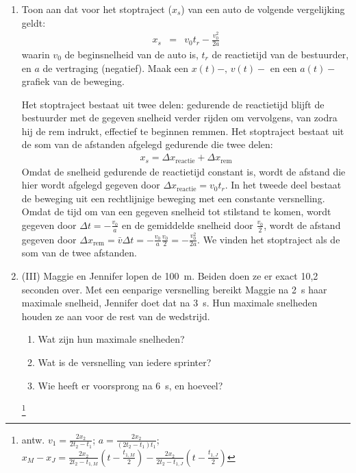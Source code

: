 \begin{enumerate}
\item Toon aan dat voor het stoptraject ($x_s$) van een auto de volgende vergelijking geldt:
\begin{eqnarray*}
x_s&=&v_0t_r-\frac{v_0^2}{2a}
\end{eqnarray*}
waarin $v_0$ de beginsnelheid van de auto is, $t_r$ de reactietijd van de bestuurder, en $a$ de vertraging (negatief).
\newline
\newline
Maak een $x(t)-,\,v(t)-$ en een $a(t)-$grafiek van de beweging.
\begin{oplossing}
\newline
\newline
Het stoptraject bestaat uit twee delen: gedurende de reactietijd blijft de bestuurder met de gegeven snelheid verder rijden om vervolgens, van zodra hij de rem indrukt, effectief te beginnen remmen. Het stoptraject bestaat uit de som van de afstanden afgelegd gedurende die twee delen:
\begin{eqnarray*}
x_s=\Delta x_{\mathrm{reactie}}+\Delta x_{\mathrm{rem}}
\end{eqnarray*}
Omdat de snelheid gedurende de reactietijd constant is, wordt de afstand die hier wordt afgelegd gegeven door $\Delta x_{\mathrm{reactie}}=v_0t_r$. In het tweede deel bestaat de beweging uit een rechtlijnige beweging met een constante versnelling. Omdat de tijd om van een gegeven snelheid tot stilstand te komen, wordt gegeven door $\Delta t=-\frac{v_0}{a}$ en de gemiddelde snelheid door $\frac{v_0}{2}$, wordt de afstand gegeven door $\Delta x_{\mathrm{rem}}=\bar{v}\Delta t=-\frac{v_0}{a}\frac{v_0}{2}=-\frac{v_0^2}{2a}$. We vinden het stoptraject als de som van de twee afstanden.
\end{oplossing}



\item (III) Maggie en Jennifer lopen de \SI{100}{m}. Beiden doen ze er exact 10,2 se\-conden over. Met een eenparige versnelling bereikt Maggie na \SI{2}{s} haar maximale snelheid, Jennifer doet dat na \SI{3}{s}. Hun maximale snelheden houden ze aan voor de rest van de wedstrijd.
\begin{enumerate}
\item Wat zijn hun maximale snelheden?
\item Wat is de versnelling van iedere sprinter?
\item Wie heeft er voorsprong na \SI{6}{s}, en hoeveel?
\end{enumerate}
\begin{oplossing}
\footnote{antw. $v_1=\frac{2x_2}{2t_2-t_1}$;
$a=\frac{2x_2}{(2t_2-t_1)t_1}$;
$x_M-x_J=\frac{2x_2}{2t_2-t_{1,M}}(t-\frac{t_{1,M}}{2})-\frac{2x_2}{2t_2-t_{1,J}}(t-\frac{t_{1,J}}{2})$}
\end{oplossing}


\end{enumerate}
